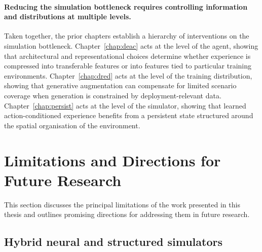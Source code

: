 \paragraph{Reducing the simulation bottleneck requires controlling information and distributions at multiple levels.}
Taken together, the prior chapters establish a hierarchy of interventions on the simulation bottleneck. Chapter~\ref{chap:deac} acts at the level of the agent, showing that architectural and representational choices determine whether experience is compressed into transferable features or into features tied to particular training environments. Chapter~\ref{chap:dred} acts at the level of the training distribution, showing that generative augmentation can compensate for limited scenario coverage when generation is constrained by deployment-relevant data. Chapter~\ref{chap:persist} acts at the level of the simulator, showing that learned action-conditioned experience benefits from a persistent state structured around the spatial organisation of the environment.


\section{Limitations and Directions for Future Research}\label{sec:limit}

This section discusses the principal limitations of the work presented in this thesis and outlines promising directions for addressing them in future research.


\subsection{Hybrid neural and structured simulators}

